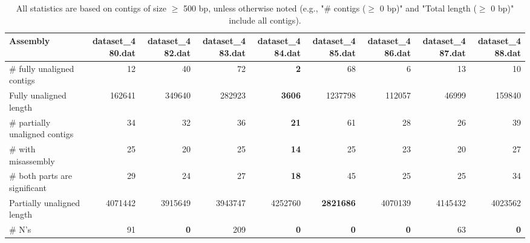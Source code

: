 \documentclass[12pt,a4paper]{article}
\begin{document}
\begin{table}[ht]
\begin{center}
\caption{All statistics are based on contigs of size $\geq$ 500 bp, unless otherwise noted (e.g., "\# contigs ($\geq$ 0 bp)" and "Total length ($\geq$ 0 bp)" include all contigs).}
\begin{tabular}{|l*{8}{|r}|}
\hline
Assembly & dataset\_480.dat & dataset\_482.dat & dataset\_483.dat & dataset\_484.dat & dataset\_485.dat & dataset\_486.dat & dataset\_487.dat & dataset\_488.dat \\ \hline
\# fully unaligned contigs & 12 & 40 & 72 & {\bf 2} & 68 & 6 & 13 & 10 \\ \hline
Fully unaligned length & 162641 & 349640 & 282923 & {\bf 3606} & 1237798 & 112057 & 46999 & 159840 \\ \hline
\# partially unaligned contigs & 34 & 32 & 36 & {\bf 21} & 61 & 28 & 26 & 39 \\ \hline
\hspace{5mm}\# with misassembly & 25 & 20 & 25 & {\bf 14} & 25 & 23 & 20 & 27 \\ \hline
\hspace{5mm}\# both parts are significant & 29 & 24 & 27 & {\bf 18} & 45 & 25 & 25 & 34 \\ \hline
Partially unaligned length & 4071442 & 3915649 & 3943747 & 4252760 & {\bf 2821686} & 4070139 & 4145432 & 4023562 \\ \hline
\# N's & 91 & {\bf 0} & 209 & {\bf 0} & {\bf 0} & {\bf 0} & 63 & {\bf 0} \\ \hline
\end{tabular}
\end{center}
\end{table}
\end{document}
